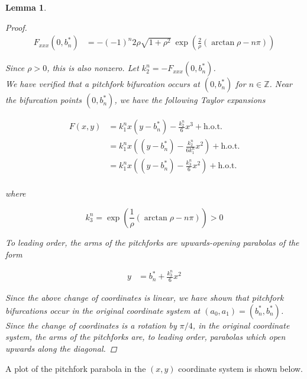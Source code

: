 \documentclass[12pt]{article}
\def\Z{{\mathbb Z}}
\newtheorem{lemma}{Lemma}
\begin{document}
\begin{lemma}
\begin{proof}
\begin{align*}
F_{xxx}(0, b_n^*)
&= -(-1)^n 2 \rho \sqrt{1 + \rho^2} \: \exp{\left(\frac{2}{\rho} (\arctan \rho - n \pi) \right)}
\end{align*}

Since $\rho > 0$, this is also nonzero. Let $k_2^n = -F_{xxx}(0, b^*_n)$. \\

We have verified that a pitchfork bifurcation occurs at $(0, b^*_n)$ for $n \in \Z$. Near the bifurcation points $(0, b_n^*)$, we have the following Taylor expansions

\begin{align*}
F(x, y) &= k_1^n x (y - b_n^*) - \frac{k_2^n}{6} x^3 + \text{h.o.t.} \\
&= k_1^n x \left( (y - b_n^*) - \frac{k_2^n}{6 k_1^n } x^2 \right) + \text{h.o.t.} \\
&= k_1^n x \left( (y - b_n^*) - \frac{k_3^n}{6} x^2 \right) + \text{h.o.t.} \\
\end{align*}

where

\begin{equation*}
k_3^n = \exp{\left(\frac{1}{\rho} (\arctan \rho - n \pi) \right)} > 0
\end{equation*}

To leading order, the arms of the pitchforks are upwards-opening parabolas of the form 

\begin{align*}
y &= b_n^* + \frac{k_3^n}{6} x^2
\end{align*}

Since the above change of coordinates is linear, we have shown that pitchfork bifurcations occur in the original coordinate system at $(a_0, a_1) = (b_n^*, b_n^*)$. Since the change of coordinates is a rotation by $\pi/4$, in the original coordinate system, the arms of the pitchforks are, to leading order, parabolas which open upwards along the diagonal.

\end{proof}
\end{lemma}

A plot of the pitchfork parabola in the $(x,y)$ coordinate system is shown below.
\end{document}
